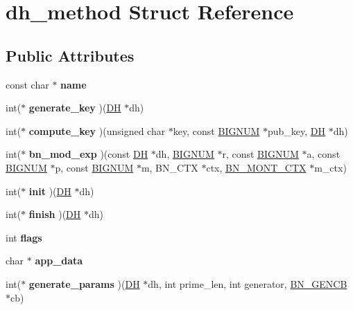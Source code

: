 \hypertarget{structdh__method}{}\section{dh\+\_\+method Struct Reference}
\label{structdh__method}
\subsection*{Public Attributes}
\begin{DoxyCompactItemize}
\item 
\mbox{\label{structdh__method_a87f4af9c60229836248385adca5caa21}} 
const char $\ast$ {\bfseries name}
\item 
\mbox{\label{structdh__method_aa044fbb69099292fac13ab075afbe8cd}} 
int($\ast$ {\bfseries generate\+\_\+key} )(\hyperlink{structdh__st}{DH} $\ast$dh)
\item 
\mbox{\label{structdh__method_a1377905955b360c0113cc24643110c28}} 
int($\ast$ {\bfseries compute\+\_\+key} )(unsigned char $\ast$key, const \hyperlink{structbignum__st}{B\+I\+G\+N\+UM} $\ast$pub\+\_\+key, \hyperlink{structdh__st}{DH} $\ast$dh)
\item 
\mbox{\label{structdh__method_af5261585e1ca4edaa2edd70a77f72274}} 
int($\ast$ {\bfseries bn\+\_\+mod\+\_\+exp} )(const \hyperlink{structdh__st}{DH} $\ast$dh, \hyperlink{structbignum__st}{B\+I\+G\+N\+UM} $\ast$r, const \hyperlink{structbignum__st}{B\+I\+G\+N\+UM} $\ast$a, const \hyperlink{structbignum__st}{B\+I\+G\+N\+UM} $\ast$p, const \hyperlink{structbignum__st}{B\+I\+G\+N\+UM} $\ast$m, B\+N\+\_\+\+C\+TX $\ast$ctx, \hyperlink{structbn__mont__ctx__st}{B\+N\+\_\+\+M\+O\+N\+T\+\_\+\+C\+TX} $\ast$m\+\_\+ctx)
\item 
\mbox{\label{structdh__method_a672b716394908a7d67984290a41015c9}} 
int($\ast$ {\bfseries init} )(\hyperlink{structdh__st}{DH} $\ast$dh)
\item 
\mbox{\label{structdh__method_adc4990f1d4887b7a495fa452d7ebfcf2}} 
int($\ast$ {\bfseries finish} )(\hyperlink{structdh__st}{DH} $\ast$dh)
\item 
\mbox{\label{structdh__method_ab1ae3816d0648ee6d7345087df0fa61c}} 
int {\bfseries flags}
\item 
\mbox{\label{structdh__method_a01cec981a5f6dd3386a24f083cf9812d}} 
char $\ast$ {\bfseries app\+\_\+data}
\item 
\mbox{\label{structdh__method_ae2c9fce365f3381757c58f0e00441453}} 
int($\ast$ {\bfseries generate\+\_\+params} )(\hyperlink{structdh__st}{DH} $\ast$dh, int prime\+\_\+len, int generator, \hyperlink{structbn__gencb__st}{B\+N\+\_\+\+G\+E\+N\+CB} $\ast$cb)
\end{DoxyCompactItemize}


